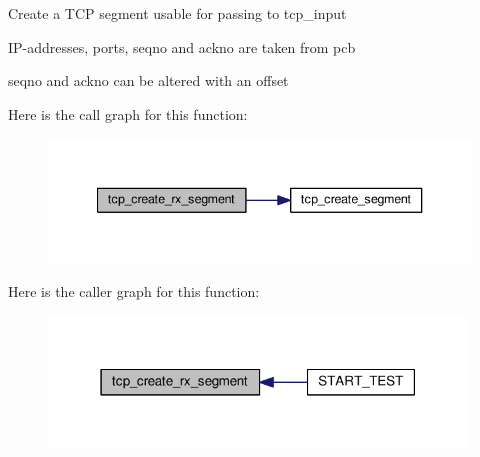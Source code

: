 Create a T\+CP segment usable for passing to tcp\+\_\+input
\begin{DoxyItemize}
\item I\+P-\/addresses, ports, seqno and ackno are taken from pcb
\item seqno and ackno can be altered with an offset 
\end{DoxyItemize}Here is the call graph for this function\+:
\nopagebreak
\begin{figure}[H]
\begin{center}
\leavevmode
\includegraphics[width=340pt]{openmote-cc2538_2lwip_2test_2unit_2tcp_2tcp__helper_8h_a53b3207c8e960cdad9af044b0606a55b_cgraph}
\end{center}
\end{figure}
Here is the caller graph for this function\+:
\nopagebreak
\begin{figure}[H]
\begin{center}
\leavevmode
\includegraphics[width=315pt]{openmote-cc2538_2lwip_2test_2unit_2tcp_2tcp__helper_8h_a53b3207c8e960cdad9af044b0606a55b_icgraph}
\end{center}
\end{figure}
\mbox{\label{openmote-cc2538_2lwip_2test_2unit_2tcp_2tcp__helper_8h_aa45bbb22d0e973f9af6732ac35faed68}} 
